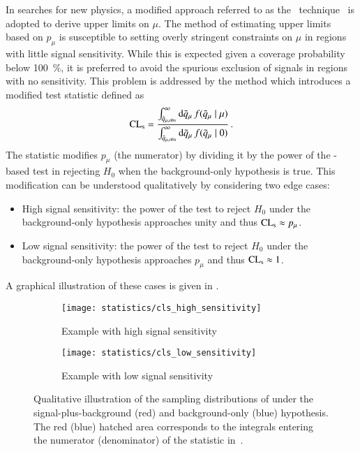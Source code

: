In searches for new physics, a modified approach referred to as the
\CLs~technique~\cite{Junk:1999kv,Read:2002hq} is adopted to derive upper limits
on $\mu$. The method of estimating upper limits based on $p_\mu$ is susceptible
to setting overly stringent constraints on $\mu$ in regions with little signal
sensitivity. While this is expected given a coverage probability below
\SI{100}{\percent}, it is preferred to avoid the spurious exclusion of signals
in regions with no sensitivity. This problem is addressed by the \CLs method
which introduces a modified test statistic defined as
\begin{align}
  \text{CL}_{\text{s}} = \frac
  {\int_{\tilde{q}_{\mu, \text{obs}}}^{\infty} \mathrm{d}\tilde{q}_{\mu} \, f(\tilde{q}_{\mu} \mid \mu)}
  {\int_{\tilde{q}_{\mu, \text{obs}}}^\infty \mathrm{d}\tilde{q}_{\mu} \, f(\tilde{q}_{\mu} \mid 0)} \,\text{.}
  \label{eq:cls}
\end{align}
The \CLs statistic modifies $p_\mu$ (the numerator) by dividing it by the power
of the \qmutilde-based test in rejecting $H_0$ when the background-only
hypothesis is true. This modification can be understood qualitatively by
considering two edge cases:
\begin{itemize}

\item High signal sensitivity: the power of the test to reject $H_0$ under the
  background-only hypothesis approaches unity and thus $\text{CL}_{\text{s}} \approx p_\mu$.

\item Low signal sensitivity: the power of the test to reject $H_0$ under the
  background-only hypothesis approaches $p_\mu$ and thus $\text{CL}_{\text{s}} \approx 1$.

\end{itemize}
A graphical illustration of these cases is given in .

\begin{figure}[htbp]
  \centering

  \begin{subfigure}{0.46\textwidth}
    \texttt{[image: statistics/cls\_high\_sensitivity]}
    \caption{Example with high signal sensitivity}
  \end{subfigure}\hfill%
  \begin{subfigure}{0.46\textwidth}
    \texttt{[image: statistics/cls\_low\_sensitivity]}
    \caption{Example with low signal sensitivity}
  \end{subfigure}

  \caption{Qualitative illustration of the sampling distributions of \qmutilde
    under the signal-plus-background (red) and background-only (blue)
    hypothesis. The red (blue) hatched area corresponds to the integrals
    entering the numerator (denominator) of the \CLs statistic
    in~.}%
  \label{fig:cls_qmutilde}
\end{figure}


